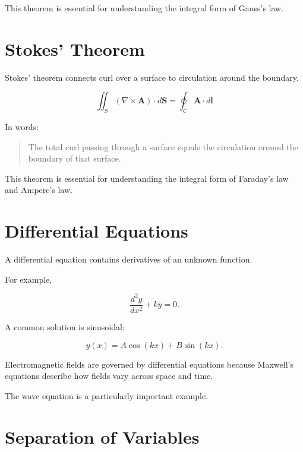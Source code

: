 \documentclass[11pt]{article}
\newcommand{\vect}[1]{\mathbf{#1}}
\begin{document}
This theorem is essential for understanding the integral form of Gauss's law.



\section{Stokes' Theorem}

Stokes' theorem connects curl over a surface to circulation around the boundary.

\[
\boxed{
\iint_S
(\nabla\times\vect{A})
\cdot d\vect{S}
=
\oint_C
\vect{A}\cdot d\vect{l}
}
\]

In words:

\begin{quote}
The total curl passing through a surface equals the circulation around the boundary of that surface.
\end{quote}

This theorem is essential for understanding the integral form of Faraday's law and Ampere's law.



\section{Differential Equations}

A differential equation contains derivatives of an unknown function.

For example,

\[
\frac{d^2y}{dx^2}+ky=0.
\]

A common solution is sinusoidal:

\[
y(x)
=
A\cos(kx)
+
B\sin(kx).
\]

Electromagnetic fields are governed by differential equations because Maxwell's equations describe how fields vary across space and time.

The wave equation is a particularly important example.



\section{Separation of Variables}
\end{document}

